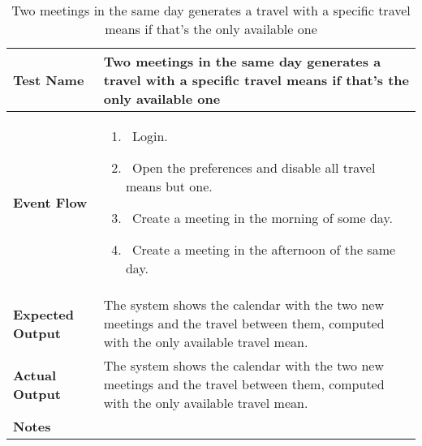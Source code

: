 \begin{table}[h]	
\centering
\def\arraystretch{1.5}
\begin{tabular}{|m{7cm}|m{7cm}|}
	\hline
	\textbf{Test Name}            &  Two meetings in the same day generates a travel with a specific travel means if that's the only available one  \\ \hline
	\textbf{Event Flow}             &   
		\begin{enumerate}
			\item~Login.
			\item~Open the preferences and disable all travel means but one.
			\item~Create a meeting in the morning of some day.
			\item~Create a meeting in the afternoon of the same day.
		\end{enumerate}
	\\ \hline
	\textbf{Expected Output}  &   The system shows the calendar with the two new meetings and the travel between them, computed with the only available travel mean.  \\ \hline
	\textbf{Actual Output}       &  The system shows the calendar with the two new meetings and the travel between them, computed with the only available travel mean.   \\ \hline
	\textbf{Notes} & \\ \hline
\end{tabular}
\caption{Two meetings in the same day generates a travel with a specific travel means if that's the only available one}
\end{table}